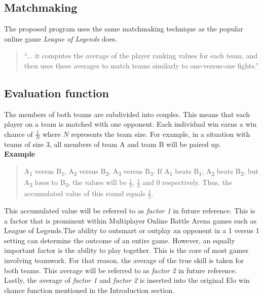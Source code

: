 \documentclass[12pt]{article}
\begin{document}
\subsection{Matchmaking}

The proposed program uses the same matchmaking technique as the popular online game \textit{League of Legends} does.

\begin{quote}
``... it computes the average of the player ranking values for each team, and then uses these averages to match teams similarly to one-versus-one fights.''\cite{moba}
\end{quote}


\subsection{Evaluation function}
The members of both teams are subdivided into couples. This means that each player on a team is matched with one opponent. Each individual win earns a win chance of $\frac{1}{N}$ where $N$ represents the team size. 
For example, in a situation with teams of size 3, all members of team A and team B will be paired up.\\
\textbf{Example}
\begin{quote}
A\textsubscript{1} versus B\textsubscript{1}, A\textsubscript{2} versus B\textsubscript{2}, A\textsubscript{3} versus B\textsubscript{3}.
If A\textsubscript{1} beats B\textsubscript{1}, A\textsubscript{2} beats B\textsubscript{2}, but A\textsubscript{3} loses to B\textsubscript{3}, the values will be $\frac{1}{3}$, $\frac{1}{3}$ and $0$ respectively. Thus, the accumulated value of this round equals $\frac{2}{3}$.
\end{quote}

This accumulated value will be referred to as \textit{factor 1} in future reference. This is a factor that is prominent within Multiplayer Online Battle Arena games such as League of Legends\cite{moba}.The ability to outsmart or outplay an opponent in a 1 versus 1 setting can determine the outcome of an entire game. However, an equally important factor is the ability to play together. This is the core of most games involving teamwork. For that reason, the average of the true skill is taken for both teams. This average will be referred to as \textit{factor 2} in future reference.
Lastly, the average of \textit{factor 1} and \textit{factor 2} is inserted into the original Elo win chance function mentioned in the Introduction section.
\end{document}
